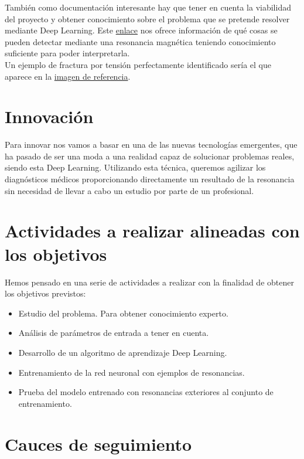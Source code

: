 \documentclass[a4paper,12pt,oneside]{article}
\begin{document}
También como documentación interesante hay que tener en cuenta la viabilidad del proyecto y obtener conocimiento sobre el problema que se pretende resolver mediante Deep Learning. Este \href{https://blog.hospitalsanangelinn.mx/resonancia-magnetica-diagnostico}{enlace} nos ofrece información de qué cosas se pueden detectar mediante una resonancia magnética teniendo conocimiento suficiente para poder interpretarla. \\

Un ejemplo de fractura por tensión perfectamente identificado sería el que aparece en la \href{https://www.google.es/search?q=resonancia+magnetica+con+fractura&source=lnms&tbm=isch&sa=X&ved=0ahUKEwj_ydaisK7eAhVDgRoKHeGoDsUQ_AUIDigB&biw=1536&bih=754#imgrc=5wcLStUv22LjAM:}{imagen de referencia}.

\section{Innovación}

Para innovar nos vamos a basar en una de las nuevas tecnologías emergentes, que ha pasado de ser una moda a una realidad capaz de solucionar problemas reales, siendo esta Deep Learning. Utilizando esta técnica, queremos agilizar los diagnósticos médicos proporcionando directamente un resultado de la resonancia sin necesidad de llevar a cabo un estudio por parte de un profesional.

\section{Actividades a realizar alineadas con los objetivos}

Hemos pensado en una serie de actividades a realizar con la finalidad de obtener los objetivos previstos:

\begin{itemize}
	\item Estudio del problema. Para obtener conocimiento experto.
	\item Análisis de parámetros de entrada a tener en cuenta.
	\item Desarrollo de un algoritmo de aprendizaje Deep Learning.
	\item Entrenamiento de la red neuronal con ejemplos de resonancias.
	\item Prueba del modelo entrenado con resonancias exteriores al conjunto de entrenamiento.
\end{itemize}

\section{Cauces de seguimiento}
\end{document}
